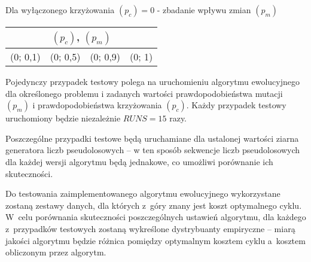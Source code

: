 \documentclass[12pt, a4paper]{article}
\begin{document}
\bigskip

Dla wyłączonego krzyżowania $(p_c) = 0$ - zbadanie wpływu zmian $(p_m)$
\begin{center}
\begin{tabular}{|l|l|l|l|}
\hline
\multicolumn{4}{|c|}{$(p_c)$, $(p_m)$} \\
\hline
(0; 0,1) & (0; 0,5) & (0; 0,9) & (0; 1)\\
\hline
\end{tabular}
\end{center}

\bigskip
Pojedynczy przypadek testowy polega na uruchomieniu algorytmu ewolucyjnego dla określonego problemu i zadanych wartości prawdopodobieństwa mutacji $(p_m)$ i prawdopodobieństwa krzyżowania $(p_c)$. Każdy przypadek testowy uruchomiony będzie niezależnie $RUNS = 15$ razy.

Poszczególne przypadki testowe będą uruchamiane dla ustalonej wartości ziarna generatora liczb pseudolosowych -- w ten sposób sekwencje liczb pseudolosowych dla każdej wersji algorytmu będą jednakowe, co umożliwi porównanie ich skuteczności.

Do testowania zaimplementowanego algorytmu ewolucyjnego wykorzystane zostaną zestawy danych, dla których z~góry znany jest koszt optymalnego cyklu. W~celu porównania skuteczności poszczególnych ustawień algorytmu, dla każdego z~przypadków testowych zostaną wykreślone dystrybuanty empiryczne -- miarą jakości algorytmu będzie różnica pomiędzy optymalnym kosztem cyklu a~kosztem obliczonym przez algorytm.
 
\nocite{*}


\end{document}
